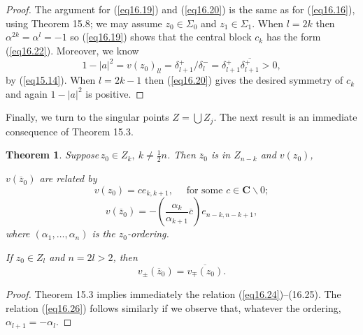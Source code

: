 \documentclass{surv-l}
\theoremstyle{plain}
\newtheorem{theorem}{Theorem}[section]
\theoremstyle{definition}
\numberwithin{equation}{chapter}
\begin{document}
\begin{proof}
The argument for (\ref{eq16.19}) and (\ref{eq16.20}) is the same as for (\ref{eq16.16}), using Theorem 15.8; we may assume $z_{0}\in\Sigma_{0}$ and $z_{1}\in\Sigma_{1}$. When $l=2k$ then $\alpha^{2k}=\alpha^{l}=-1$ so (\ref{eq16.19}) shows that the central block $c_{k}$ has the form (\ref{eq16.22}). Moreover, we know
\begin{equation*}
1-|a|^{2}=v(z_{0})_{ll}=\delta_{l+1}^{+}/\delta_{l}^{-}=\delta_{l+1}^{+}\overline{\delta_{l+1}^{+}}>0,
\end{equation*}
by (\ref{eq15.14}). When $l=2k-1$ then (\ref{eq16.20}) gives the desired symmetry of $c_{k}$ and again $1-|a|^{2}$ is positive.
\end{proof}
Finally, we turn to the singular points $Z=\bigcup Z_{j}$. The next result is an immediate consequence of Theorem 15.3.
\setcounter{theorem}{22}
\begin{theorem}\label{thm16.23}
Suppose\,$z_{0}\in Z_{k},\ k\neq\frac{1}{2}n$.  Then $\overline{z}_{0}$ is in $Z_{n-k}$  and $v(z_{0})$,

$v(\overline{z}_{0})$ are related by
\setcounter{equation}{23}
\begin{equation}\label{eq16.24}
v(z_{0})=ce_{k,k+1},\quad  \text{ for some } c\in \mathbf{C}\backslash 0;
\end{equation}
\begin{equation}\label{eq16.25}
v(\overline{z}_{0})=-\left(\frac{\alpha_{k}}{\alpha_{k+1}}\overline{c}\right)e_{n-k,n-k+1},
\end{equation}
where $(\alpha_{1},\ldots,\alpha_{n})$ is the $z_{0}$-ordering.

If $z_{0}\in Z_{l}$ and $n=2l>2$, then
\begin{equation}\label{eq16.26}
v_{\pm}(\overline{z}_{0})=\overline{v_{\mp}(z_{0})}.
\end{equation}
\end{theorem}

\begin{proof}
Theorem 15.3 implies immediately the relation (\ref{eq16.24})--(16.25). The relation (\ref{eq16.26}) follows similarly if we observe that, whatever the ordering, $\alpha_{l+1}=-\alpha_{l}$.
\end{proof}
\end{document}
